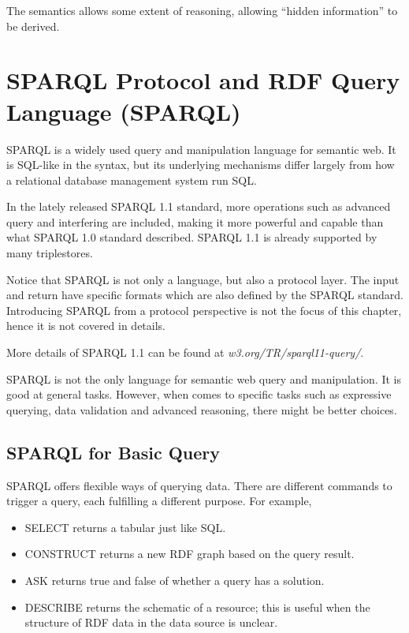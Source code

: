 The semantics allows some extent of reasoning, allowing ``hidden information'' to be derived.

\section{SPARQL Protocol and RDF Query Language (SPARQL)}

SPARQL is a widely used query and manipulation language for semantic web. It is SQL-like in the syntax, but its underlying mechanisms differ largely from how a relational database management system run SQL.

In the lately released SPARQL 1.1 standard, more operations such as advanced query and interfering are included, making it more powerful and capable than what SPARQL 1.0 standard described. SPARQL 1.1 is already supported by many triplestores.

Notice that SPARQL is not only a language, but also a protocol layer. The input and return have specific formats which are also defined by the SPARQL standard. Introducing SPARQL from a protocol perspective is not the focus of this chapter, hence it is not covered in details. 

More details of SPARQL 1.1 can be found at \textit{w3.org/TR/sparql11-query/}.

SPARQL is not the only language for semantic web query and manipulation. It is good at general tasks. However, when comes to specific tasks such as expressive querying, data validation and advanced reasoning, there might be better choices.

\subsection{SPARQL for Basic Query}

SPARQL offers flexible ways of querying data. There are different commands to trigger a query, each fulfilling a different purpose. For example,
\begin{itemize}
	\item SELECT returns a tabular just like SQL.
	\item CONSTRUCT returns a new RDF graph based on the query result.
	\item ASK returns true and false of whether a query has a solution.
	\item DESCRIBE returns the schematic of a resource; this is useful when the structure of RDF data in the data source is unclear.
\end{itemize}

